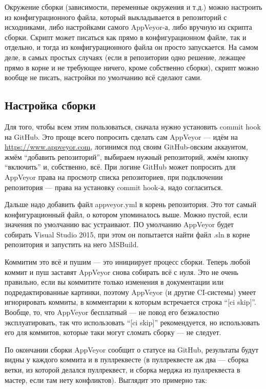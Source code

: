 \documentclass[a5paper]{article}
\begin{document}
Окружение сборки (зависимости, переменные окружения и т.д.) можно настроить из конфигурационного файла, который выкладывается в репозиторий с исходниками, либо настройками самого AppVeyor-а, либо вручную из скрипта сборки. Скрипт может писаться как прямо в конфигурационном файле, так и отдельно, и тогда из конфигурационного файла он просто запускается. На самом деле, в самых простых случаях (если в репозитории одно решение, лежащее прямо в корне и не требующее ничего, кроме собственно сборки), скрипт можно вообще не писать, настройки по умолчанию всё сделают сами.

\subsection{Настройка сборки}

Для того, чтобы всем этим пользоваться, сначала нужно установить commit hook на GitHub. Это проще всего попросить сделать сам AppVeyor --- идём на \url{https://www.appveyor.com}, логинимся под своим GitHub-овским аккаунтом, жмём ``добавить репозиторий'', выбираем нужный репозиторий, жмём кнопку ``включить'' и, собственно, всё. При логине GitHub может попросить для AppVeyor права на просмотр списка репозиториев, при подключении репозитория --- права на установку commit hook-а, надо согласиться.

Дальше надо добавить файл appveyor.yml в корень репозитория. Это тот самый конфигурационный файл, о котором упоминалось выше. Можно пустой, если значения по умолчанию вас устраивают. ПО умолчанию AppVeyor будет собирать Visual Studio 2015, при этом он попытается найти файл .sln в корне репозитория и запустить на него MSBuild.

Коммитим это всё и пушим --- это инициирует процесс сборки. Теперь любой коммит и пуш заставят AppVeyor снова собирать всё с нуля. Это не очень правильно, если вы коммитите только изменения в документации или подредактированные картинки, поэтому AppVeyor (и другие CI-системы) умеет игнорировать коммиты, в комментарии к которым встречается строка ``[ci skip]''. Вообще, то, что AppVeyor бесплатный --- не повод его безжалостно эксплуатировать, так что использовать ``[ci skip]'' рекомендуется, но использовать его для коммитов, которые таки могут сломать сборку --- не следует.

По окончании сборки AppVeyor сообщит о статусе на GitHub, результаты будут видны у каждого коммита и в пуллреквесте (в пуллреквесте аж два --- сборка ветки, из которой делался пуллреквест, и сборка мерджа из пуллреквеста в мастер, если там нету конфликтов). Выглядит это примерно так:
\end{document}
